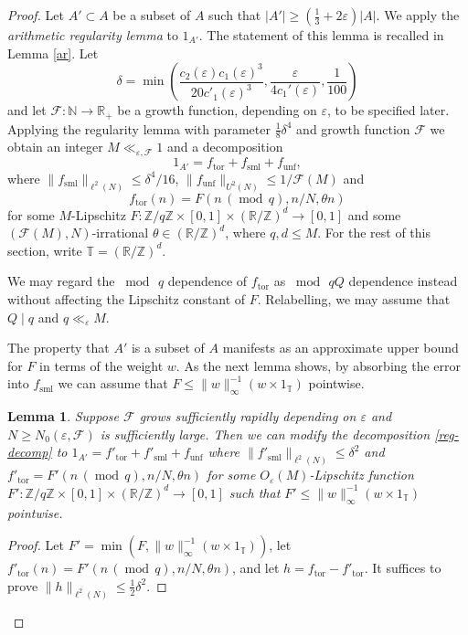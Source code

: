 \documentclass[10pt,reqno]{amsart}
\newtheorem{lemma}[theorem]{Lemma}
\theoremstyle{definition}
\theoremstyle{remark}
\newcommand{\md}[1]{\ensuremath{\,(\operatorname{mod}\, #1)}}
\renewcommand{\leq}{\leqslant}
\renewcommand{\geq}{\geqslant}
\newcommand\tor{\operatorname{tor}}
\newcommand\sml{\operatorname{sml}}
\newcommand\unf{\operatorname{unf}}
\def\R{\mathbb{R}}
\def\Z{\mathbb{Z}}
\def\N{\mathbb{N}}
\def\T{\mathbb{T}}
\def\eps{\varepsilon}
\numberwithin{equation}{section}
\begin{document}
\begin{proof}
Let $A'\subset A$ be a subset of $A$ such that $|A'| \geq (\frac{1}{3} + 2\eps)|A|$. We apply the \emph{arithmetic regularity lemma} \cite{green-tao-arithregularity} to $1_{A'}$. The statement of this lemma is recalled in Lemma \ref{ar}. Let \begin{equation}\label{delta-choice} \delta = \min\left(\frac{c_2(\eps)c_1(\eps)^3}{20c'_1(\eps)^3},\frac{\eps}{4 c_1'(\eps)}, \frac{1}{100}\right)\end{equation} and let $\mathcal{F} : \N \rightarrow \R_+$ be a growth function, depending on $\eps$, to be specified later. Applying the regularity lemma with parameter $\tfrac{1}{8}\delta^4$ and growth function $\mathcal{F}$ we obtain an integer $M\ll_{\eps,\mathcal{F}} 1$ and a decomposition
\begin{equation}\label{reg-decomp} 1_{A'} = f_{\tor} + f_{\sml} + f_{\unf},\end{equation}
where $\|f_{\sml} \|_{\ell^2(N)} \leq \delta^4 / 16$, $\| f_{\unf} \|_{U^2(N)} \leq 1/\mathcal{F}(M)$ and
\begin{equation}\label{f-tor} f_{\tor}(n) = F(n \md{q}, n/N, \theta n)\end{equation}
for some $M$-Lipschitz $F:\Z/q\Z\times[0,1]\times(\R/\Z)^d\to[0,1]$ and some $(\mathcal{F}(M),N)$-irrational $\theta \in (\R/\Z)^d$, where $q,d \leq M$. For the rest of this section, write $\T = (\R/\Z)^d$.

We may regard the $\bmod\,q$ dependence of $f_{\tor}$ as $\bmod\,qQ$ dependence instead without affecting the Lipschitz constant of $F$. Relabelling, we may assume that $Q\mid q$ and $q\ll_\eps M$.

The property that $A'$ is a subset of $A$ manifests as an approximate upper bound for $F$ in terms of the weight $w$. As the next lemma shows, by absorbing the error into $f_{\sml}$ we can assume that $F \leq \|w\|_\infty^{-1} (w \times 1_{\T})$ pointwise.

\begin{lemma}\label{dom}
Suppose $\mathcal{F}$ grows sufficiently rapidly depending on $\eps$ and $N\geq N_0(\eps,\mathcal{F})$ is sufficiently large. Then we can modify the decomposition \eqref{reg-decomp} to $1_{A'} = f'_{\tor} + f'_{\sml} + f_{\unf}$ where $\| f'_{\sml} \|_{\ell^2(N)} \leq \delta^2$ and $f'_{\tor} = F'(n \md{q}, n/N, \theta n)$ for some $O_\eps(M)$-Lipschitz function $F' : \Z/q\Z \times [0,1] \times (\R/\Z)^d \to [0,1]$ such that $F' \leq \|w\|_\infty^{-1} (w \times 1_\T)$ pointwise.
\end{lemma}
\begin{proof}
Let $F' = \min\left(F,\|w\|_\infty^{-1} (w\times 1_\T)\right)$, let $f'_{\tor}(n) = F'(n\md q, n/N,\theta n)$, and let $h = f_{\tor} - f'_{\tor}$. It suffices to prove $\|h\|_{\ell^2(N)}\leq\tfrac{1}{2}\delta^2$. 


\end{proof}
\end{proof}
\end{document}
